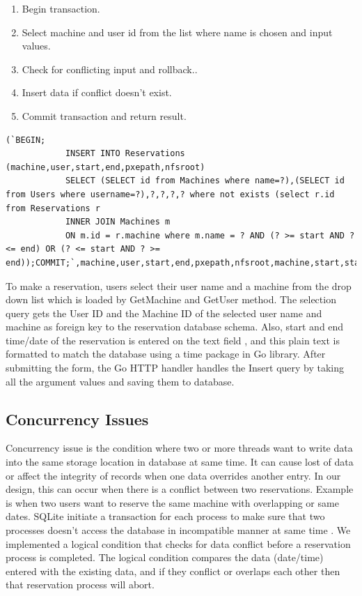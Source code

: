 \begin{lstlisting}[caption=Pseudocode, label=addreservation]
\end{lstlisting}
	\begin{enumerate}
	\item Begin transaction.
	\item Select machine and user id from the list where name is chosen and input values.
	\item Check for conflicting input and rollback..
	\item Insert data if conflict doesn't exist.
	\item Commit transaction and return result.
	\end{enumerate}
\begin{lstlisting}[caption=Storing Reservation details, label=Adding reservation]
	 (`BEGIN;
	      	INSERT INTO Reservations (machine,user,start,end,pxepath,nfsroot)
			SELECT (SELECT id from Machines where name=?),(SELECT id from Users where username=?),?,?,?,? where not exists (select r.id from Reservations r 
			INNER JOIN Machines m 
			ON m.id = r.machine where m.name = ? AND (? >= start AND ? <= end) OR (? <= start AND ? >= end));COMMIT;`,machine,user,start,end,pxepath,nfsroot,machine,start,start,end,end)

\end{lstlisting}

To make a reservation, users select their user name and a machine from the drop down list which is loaded by GetMachine and GetUser method. The selection query gets the User ID and the Machine ID of the selected user name and machine as foreign key to the reservation database schema. Also, start and end time/date of the reservation is entered on the text field , and this plain text is formatted to match the database using a time package in Go library. After submitting the form, the Go HTTP handler handles the Insert query by taking all the argument values and saving them to database. 
\subsection*{Concurrency Issues}
Concurrency issue is the condition where two or more threads want to write data into the same storage location in database at same time. It can cause lost of data or affect the integrity of records when one data overrides another entry. In our design, this can occur when there is a conflict between two reservations. Example is when two users want to reserve the same machine with overlapping or same dates. SQLite initiate a transaction for each process to make sure that two processes doesn't access the database in incompatible manner at same time . We implemented a logical condition that checks for data conflict before a reservation process is completed. The logical condition compares the data (date/time) entered with the existing data, and if they conflict or overlaps each other then that reservation process will abort.
